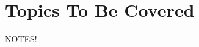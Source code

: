 \documentclass[12pt]{article}
\begin{document}
\maketitle
\section{Topics To Be Covered}
NOTES!
\end{document}
